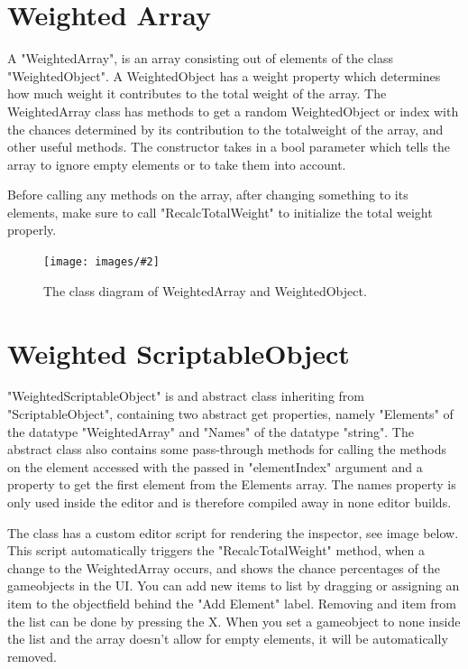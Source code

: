 \documentclass{paper}
\newlength{\imgwidth} %
\newcommand\scalegraphics[3][]
{
	\begin{figure}[H]
	\centering
	\settowidth{\imgwidth}{\texttt{[image: images/\#2]}} %
	\setlength{\imgwidth}{\minof{#1\imgwidth}{\textwidth}} %
	\texttt{[image: images/\#2]} %
	\caption{#3}
	\end{figure}
}
\newcommand*\bracket[1]{\lbrack#1\rbrack} %
\begin{document}
\newpage
\section{Weighted Array}\label{sec:wa}
A "WeightedArray", is an array consisting out of elements of the class "WeightedObject". A WeightedObject has a weight property which determines how much weight it contributes to the total weight of the array. The WeightedArray class has methods to get a random WeightedObject or index with the chances determined by its contribution to the totalweight of the array, and other useful methods. The constructor takes in a bool parameter which tells the array to ignore empty elements or to take them into account.
\par
Before calling any methods on the array, after changing something to its elements, make sure to call "RecalcTotalWeight" to initialize the total weight properly.

\scalegraphics[0.7]{WeightedArray_CD.png}{The class diagram of WeightedArray and WeightedObject.}

\newpage
\section{Weighted ScriptableObject}\label{sec:wso}
"WeightedScriptableObject" is and abstract class inheriting from "ScriptableObject", containing two abstract get properties, namely "Elements" of the datatype "WeightedArray\bracket{}" and "Names" of the datatype "string". The abstract class also contains some pass-through methods for calling the methods on the element accessed with the passed in "elementIndex" argument and a property to get the first element from the Elements array. The names property is only used inside the editor and is therefore compiled away in none editor builds.
\par
The class has a custom editor script for rendering the inspector, see image below. This script automatically triggers the "RecalcTotalWeight" method, when a change to the WeightedArray occurs, and shows the chance percentages of the gameobjects in the UI. You can add new items to list by dragging or assigning an item to the objectfield behind the "Add Element" label. Removing and item from the list can be done by pressing the \bracket{X}. When you set a gameobject to none inside the list and the array doesn't allow for empty elements, it will be automatically removed.
\end{document}
